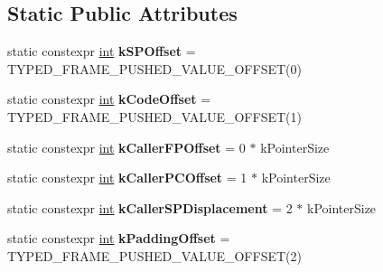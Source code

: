 \subsection*{Static Public Attributes}
\begin{DoxyCompactItemize}
\item 
\mbox{\label{classv8_1_1internal_1_1ExitFrameConstants_a612ee4551c0204993ba033f95090d592}} 
static constexpr \mbox{\hyperlink{classint}{int}} {\bfseries k\+S\+P\+Offset} = T\+Y\+P\+E\+D\+\_\+\+F\+R\+A\+M\+E\+\_\+\+P\+U\+S\+H\+E\+D\+\_\+\+V\+A\+L\+U\+E\+\_\+\+O\+F\+F\+S\+ET(0)
\item 
\mbox{\label{classv8_1_1internal_1_1ExitFrameConstants_a7710cc6988e3b8f127b74daf03d80eba}} 
static constexpr \mbox{\hyperlink{classint}{int}} {\bfseries k\+Code\+Offset} = T\+Y\+P\+E\+D\+\_\+\+F\+R\+A\+M\+E\+\_\+\+P\+U\+S\+H\+E\+D\+\_\+\+V\+A\+L\+U\+E\+\_\+\+O\+F\+F\+S\+ET(1)
\item 
\mbox{\label{classv8_1_1internal_1_1ExitFrameConstants_aaa7a17268350a6d8e46b3ca4c4ac2642}} 
static constexpr \mbox{\hyperlink{classint}{int}} {\bfseries k\+Caller\+F\+P\+Offset} = 0 $\ast$ k\+Pointer\+Size
\item 
\mbox{\label{classv8_1_1internal_1_1ExitFrameConstants_a080781a074aba9afa26d345a4ad11c4f}} 
static constexpr \mbox{\hyperlink{classint}{int}} {\bfseries k\+Caller\+P\+C\+Offset} = 1 $\ast$ k\+Pointer\+Size
\item 
\mbox{\label{classv8_1_1internal_1_1ExitFrameConstants_a017f6fbb77196ad610934c3a990878f5}} 
static constexpr \mbox{\hyperlink{classint}{int}} {\bfseries k\+Caller\+S\+P\+Displacement} = 2 $\ast$ k\+Pointer\+Size
\item 
\mbox{\label{classv8_1_1internal_1_1ExitFrameConstants_af69e130c0d13e5595d74d6c264e5bf63}} 
static constexpr \mbox{\hyperlink{classint}{int}} {\bfseries k\+Padding\+Offset} = T\+Y\+P\+E\+D\+\_\+\+F\+R\+A\+M\+E\+\_\+\+P\+U\+S\+H\+E\+D\+\_\+\+V\+A\+L\+U\+E\+\_\+\+O\+F\+F\+S\+ET(2)
\item 
\mbox{\label{classv8_1_1internal_1_1ExitFrameConstants_aa351a97e78d5db179791286f089e9527}} 

\end{DoxyCompactItemize}
